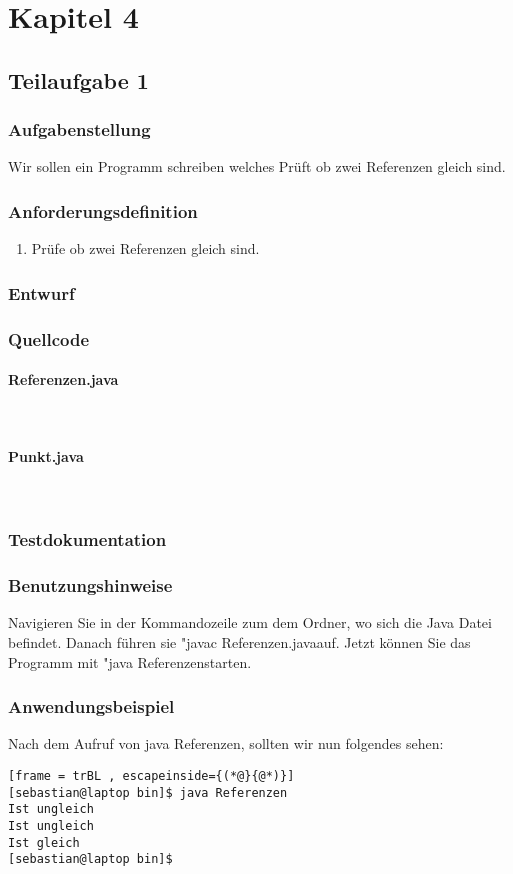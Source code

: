 \section{Kapitel 4}
\subsection{Teilaufgabe 1}
\subsubsection{Aufgabenstellung}
Wir sollen ein Programm schreiben welches Prüft ob zwei Referenzen gleich sind.

\subsubsection{Anforderungsdefinition}
\begin{enumerate}
	\item Prüfe ob zwei Referenzen gleich sind.
\end{enumerate}

\subsubsection{Entwurf}

\subsubsection{Quellcode}
\paragraph{Referenzen.java}\

\paragraph{Punkt.java}\


\subsubsection{Testdokumentation}

\subsubsection{Benutzungshinweise}
Navigieren Sie in der Kommandozeile zum dem Ordner, wo sich die Java Datei befindet.
Danach führen sie "javac Referenzen.java\dq \space auf. Jetzt können Sie das Programm mit
"java Referenzen\dq \space starten.

\subsubsection{Anwendungsbeispiel}
Nach dem Aufruf von java Referenzen, sollten wir nun folgendes sehen:
\begin{lstlisting}[frame = trBL , escapeinside={(*@}{@*)}]
[sebastian@laptop bin]$ java Referenzen 
Ist ungleich
Ist ungleich
Ist gleich
[sebastian@laptop bin]$  
\end{lstlisting}
